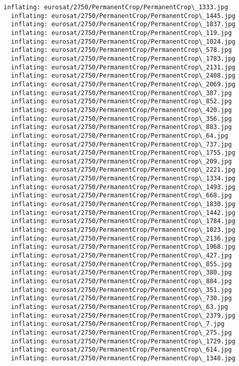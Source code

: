 \documentclass[11pt]{article}
\begin{document}
\begin{Verbatim}[commandchars=\\\{\}]
  inflating: eurosat/2750/PermanentCrop/PermanentCrop\_1333.jpg
  inflating: eurosat/2750/PermanentCrop/PermanentCrop\_1445.jpg
  inflating: eurosat/2750/PermanentCrop/PermanentCrop\_1837.jpg
  inflating: eurosat/2750/PermanentCrop/PermanentCrop\_119.jpg
  inflating: eurosat/2750/PermanentCrop/PermanentCrop\_1024.jpg
  inflating: eurosat/2750/PermanentCrop/PermanentCrop\_578.jpg
  inflating: eurosat/2750/PermanentCrop/PermanentCrop\_1783.jpg
  inflating: eurosat/2750/PermanentCrop/PermanentCrop\_2131.jpg
  inflating: eurosat/2750/PermanentCrop/PermanentCrop\_2408.jpg
  inflating: eurosat/2750/PermanentCrop/PermanentCrop\_2069.jpg
  inflating: eurosat/2750/PermanentCrop/PermanentCrop\_387.jpg
  inflating: eurosat/2750/PermanentCrop/PermanentCrop\_852.jpg
  inflating: eurosat/2750/PermanentCrop/PermanentCrop\_420.jpg
  inflating: eurosat/2750/PermanentCrop/PermanentCrop\_356.jpg
  inflating: eurosat/2750/PermanentCrop/PermanentCrop\_883.jpg
  inflating: eurosat/2750/PermanentCrop/PermanentCrop\_64.jpg
  inflating: eurosat/2750/PermanentCrop/PermanentCrop\_737.jpg
  inflating: eurosat/2750/PermanentCrop/PermanentCrop\_1755.jpg
  inflating: eurosat/2750/PermanentCrop/PermanentCrop\_209.jpg
  inflating: eurosat/2750/PermanentCrop/PermanentCrop\_2221.jpg
  inflating: eurosat/2750/PermanentCrop/PermanentCrop\_1334.jpg
  inflating: eurosat/2750/PermanentCrop/PermanentCrop\_1493.jpg
  inflating: eurosat/2750/PermanentCrop/PermanentCrop\_668.jpg
  inflating: eurosat/2750/PermanentCrop/PermanentCrop\_1830.jpg
  inflating: eurosat/2750/PermanentCrop/PermanentCrop\_1442.jpg
  inflating: eurosat/2750/PermanentCrop/PermanentCrop\_1784.jpg
  inflating: eurosat/2750/PermanentCrop/PermanentCrop\_1023.jpg
  inflating: eurosat/2750/PermanentCrop/PermanentCrop\_2136.jpg
  inflating: eurosat/2750/PermanentCrop/PermanentCrop\_1968.jpg
  inflating: eurosat/2750/PermanentCrop/PermanentCrop\_427.jpg
  inflating: eurosat/2750/PermanentCrop/PermanentCrop\_855.jpg
  inflating: eurosat/2750/PermanentCrop/PermanentCrop\_380.jpg
  inflating: eurosat/2750/PermanentCrop/PermanentCrop\_884.jpg
  inflating: eurosat/2750/PermanentCrop/PermanentCrop\_351.jpg
  inflating: eurosat/2750/PermanentCrop/PermanentCrop\_730.jpg
  inflating: eurosat/2750/PermanentCrop/PermanentCrop\_63.jpg
  inflating: eurosat/2750/PermanentCrop/PermanentCrop\_2379.jpg
  inflating: eurosat/2750/PermanentCrop/PermanentCrop\_7.jpg
  inflating: eurosat/2750/PermanentCrop/PermanentCrop\_275.jpg
  inflating: eurosat/2750/PermanentCrop/PermanentCrop\_1729.jpg
  inflating: eurosat/2750/PermanentCrop/PermanentCrop\_614.jpg
  inflating: eurosat/2750/PermanentCrop/PermanentCrop\_1348.jpg

\end{Verbatim}
\end{document}
